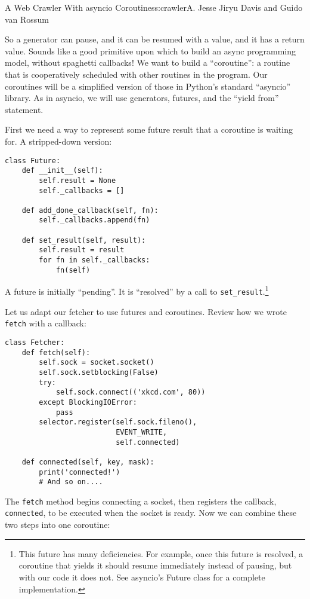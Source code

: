 \begin{aosachapter}{A Web Crawler With asyncio Coroutines}{s:crawler}{A. Jesse Jiryu Davis and Guido van Rossum}
\label{building-coroutines-with-generators}

So a generator can pause, and it can be resumed with a value, and it has
a return value. Sounds like a good primitive upon which to build an
async programming model, without spaghetti callbacks! We want to build a
``coroutine'': a routine that is cooperatively scheduled with other
routines in the program. Our coroutines will be a simplified version of
those in Python's standard ``asyncio'' library. As in asyncio, we will
use generators, futures, and the ``yield from'' statement.

First we need a way to represent some future result that a coroutine is
waiting for. A stripped-down version:

\begin{verbatim}
class Future:
    def __init__(self):
        self.result = None
        self._callbacks = []

    def add_done_callback(self, fn):
        self._callbacks.append(fn)

    def set_result(self, result):
        self.result = result
        for fn in self._callbacks:
            fn(self)
\end{verbatim}

A future is initially ``pending''. It is ``resolved'' by a call to
\texttt{set\_result}.\footnote{This future has many deficiencies. For
  example, once this future is resolved, a coroutine that yields it
  should resume immediately instead of pausing, but with our code it
  does not. See asyncio's Future class for a complete implementation.}

Let us adapt our fetcher to use futures and coroutines. Review how we
wrote \texttt{fetch} with a callback:

\begin{verbatim}
class Fetcher:
    def fetch(self):
        self.sock = socket.socket()
        self.sock.setblocking(False)
        try:
            self.sock.connect(('xkcd.com', 80))
        except BlockingIOError:
            pass
        selector.register(self.sock.fileno(),
                          EVENT_WRITE,
                          self.connected)

    def connected(self, key, mask):
        print('connected!')
        # And so on....
\end{verbatim}

The \texttt{fetch} method begins connecting a socket, then registers the
callback, \texttt{connected}, to be executed when the socket is ready.
Now we can combine these two steps into one coroutine:


\end{aosachapter}
